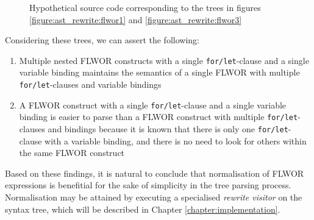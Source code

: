 \begin{figure}[!h]
	\centering
		\quad
	\caption{Hypothetical source code corresponding to the trees in figures
		\ref{figure:ast_rewrite:flwor1} and \ref{figure:ast_rewrite:flwor3}}
	\label{figure:ast_rewrite:flwor_src}
\end{figure}
\newpage
Considering these trees, we can assert the following:
\begin{enumerate}
  \item Multiple nested FLWOR constructs with a single \texttt{for/let}-clause
  and a single variable binding maintains the semantics of a single FLWOR with
  multiple \texttt{for/let}-clauses and variable bindings
  \item A FLWOR construct with a single \texttt{for/let}-clause and a single
  variable binding is easier to parse than a FLWOR construct with multiple
  \texttt{for/let}-clauses and bindings because it is known that there is only
  one \texttt{for/let}-clause with a variable binding, and there is no need to
  look for others within the same FLWOR construct
\end{enumerate}

Based on these findings, it is natural to conclude that normalisation of FLWOR
expressions is benefitial for the sake of simplicity in the tree parsing
process. Normalisation may be attained by executing a specialised
\textit{rewrite visitor} on the syntax tree, which will be described in
Chapter \ref{chapter:implementation}.
